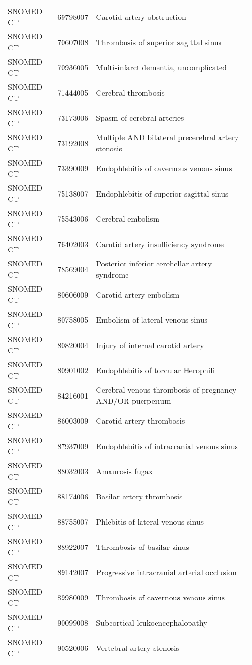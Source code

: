 \begin{longtable}{p{}p{}p{}}
  SNOMED CT & 69798007 & Carotid artery obstruction \\ 
  SNOMED CT & 70607008 & Thrombosis of superior sagittal sinus \\ 
  SNOMED CT & 70936005 & Multi-infarct dementia, uncomplicated \\ 
  SNOMED CT & 71444005 & Cerebral thrombosis \\ 
  SNOMED CT & 73173006 & Spasm of cerebral arteries \\ 
  SNOMED CT & 73192008 & Multiple AND bilateral precerebral artery stenosis \\ 
  SNOMED CT & 73390009 & Endophlebitis of cavernous venous sinus \\ 
  SNOMED CT & 75138007 & Endophlebitis of superior sagittal sinus \\ 
  SNOMED CT & 75543006 & Cerebral embolism \\ 
  SNOMED CT & 76402003 & Carotid artery insufficiency syndrome \\ 
  SNOMED CT & 78569004 & Posterior inferior cerebellar artery syndrome \\ 
  SNOMED CT & 80606009 & Carotid artery embolism \\ 
  SNOMED CT & 80758005 & Embolism of lateral venous sinus \\ 
  SNOMED CT & 80820004 & Injury of internal carotid artery \\ 
  SNOMED CT & 80901002 & Endophlebitis of torcular Herophili \\ 
  SNOMED CT & 84216001 & Cerebral venous thrombosis of pregnancy AND/OR puerperium \\ 
  SNOMED CT & 86003009 & Carotid artery thrombosis \\ 
  SNOMED CT & 87937009 & Endophlebitis of intracranial venous sinus \\ 
  SNOMED CT & 88032003 & Amaurosis fugax \\ 
  SNOMED CT & 88174006 & Basilar artery thrombosis \\ 
  SNOMED CT & 88755007 & Phlebitis of lateral venous sinus \\ 
  SNOMED CT & 88922007 & Thrombosis of basilar sinus \\ 
  SNOMED CT & 89142007 & Progressive intracranial arterial occlusion \\ 
  SNOMED CT & 89980009 & Thrombosis of cavernous venous sinus \\ 
  SNOMED CT & 90099008 & Subcortical leukoencephalopathy \\ 
  SNOMED CT & 90520006 & Vertebral artery stenosis \\ 

\end{longtable}
